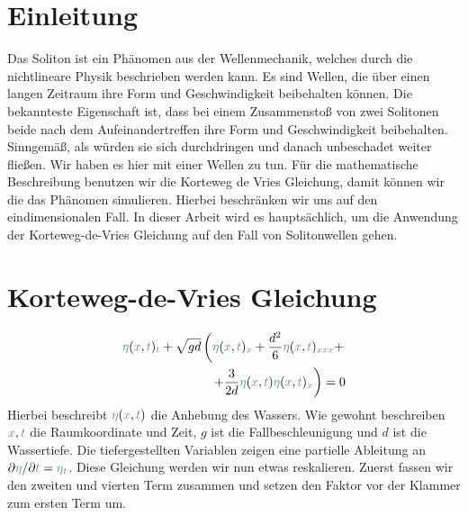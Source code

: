 \documentclass[10pt,fleqn,%
reqno,a4paper]{article}
\makeatletter
\def\mathcolor#1#{\@mathcolor{#1}}
\def\@mathcolor#1#2#3{%
        \protect\leavevmode
        \begingroup\color#1{#2}#3\endgroup
}
\newcommand{\nx}{\mathcolor{gray}{x}}
\newcommand{\nt}{\mathcolor{gray}{t}}
\newcommand{\neta}{\mathcolor{cyan!70!black}{\eta}}
\makeatother
\begin{document}
\nwdocspar


\tableofcontents
\newpage
\section{Einleitung}

Das Soliton ist ein Phänomen aus der Wellenmechanik, welches durch die nichtlineare Physik beschrieben werden kann.
Es sind Wellen, die über einen langen Zeitraum ihre Form und Geschwindigkeit beibehalten können. 
Die bekannteste Eigenschaft ist, dass bei einem Zusammenstoß von zwei Solitonen beide nach dem Aufeinandertreffen ihre Form und Geschwindigkeit beibehalten. 
Sinngemäß, als würden sie sich durchdringen und danach unbeschadet weiter fließen.
Wir haben es hier mit einer Wellen zu tun.
Für die mathematische Beschreibung benutzen wir die Korteweg de Vries Gleichung, damit können wir die das Phänomen simulieren. 
Hierbei beschränken wir uns auf den eindimensionalen Fall. 
In dieser Arbeit wird es hauptsächlich, um die Anwendung der Korteweg-de-Vries Gleichung auf den Fall von Solitonwellen gehen.


\section{Korteweg-de-Vries Gleichung}

\begin{align}
        \neta (\nx, \nt) _{\nt} + \sqrt{gd} \left( \neta (\nx, \nt) _{\nx} + \frac{d^2}{6}\neta (\nx, \nt) _{\nx\nx\nx}+\right.\\
        \left. +\frac{3}{2d}\neta (\nx, \nt) \neta (\nx, \nt) _{\nx} \right) = 0 \label{g:KoVri}
\end{align}
Hierbei beschreibt $ \neta (\nx, \nt) $ die Anhebung des Wassers.
Wie gewohnt beschreiben $ \nx, \nt $ die Raumkoordinate und Zeit, $ g $ ist die Fallbeschleunigung und $ d $ ist die Wassertiefe. 
Die tiefergestellten Variablen zeigen eine partielle Ableitung an $ \partial \neta / \partial \nt = \neta _{\nt}$.
Diese Gleichung werden wir nun etwas reskalieren. Zuerst fassen wir den zweiten und vierten Term zusammen und setzen den Faktor vor der Klammer zum ersten Term um.
\end{document}
